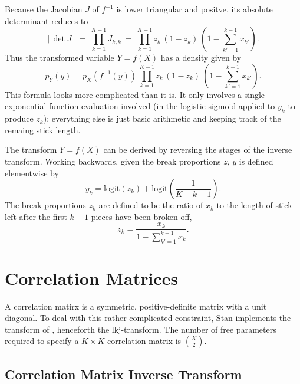 \documentclass[10pt]{report}
\newcommand{\Stan}{Stan\xspace}
\newcommand{\acronym}[1]{{\sc #1}\xspace}
\newcommand{\LKJ}{\acronym{lkj}}
\begin{document}
Because the Jacobian $J$ of $f^{-1}$ is lower triangular and positve, its
absolute determinant reduces to
%
\[
\left| \, \det J \, \right|
\ = \
\prod_{k=1}^{K-1} J_{k,k}
\ = \
\prod_{k=1}^{K-1} 
z_k
\, 
(1 - z_k)
\
\left(
1 - \sum_{k'=1}^{k-1} x_{k'}
\right)
.
\]
%
Thus the transformed variable $Y = f(X)$ has a density given by
%
\[
p_Y(y) 
= p_X(f^{-1}(y))
\,
\prod_{k=1}^{K-1} 
z_k
\, 
(1 - z_k)
\
\left(
1 - \sum_{k'=1}^{k-1} x_{k'}
\right)
.
\]
%
This formula looks more complicated than it is.  It only involves a
single exponential function evaluation involved (in the logistic
sigmoid applied to $y_k$ to produce $z_k$);  everything else is just
basic arithmetic and keeping track of the remaing stick length.

The transform $Y = f(X)$ can be derived by reversing the stages of the
inverse transform.  Working backwards, given the break proportions
$z$, $y$ is defined elementwise by
%
\[
y_k 
= \mbox{logit}(z_k)
+ \mbox{logit}\left(
   \frac{1}{K-k+1}
   \right)
.
\]
%
The break proportions $z_k$ are defined to be the ratio of $x_k$ to
the length of stick left after the first $k-1$ pieces have been broken
off, 
%
\[
z_k 
= \frac{x_k}
       {1 - \sum_{k' = 1}^{k-1} x_k}
.
\]

\section{Correlation Matrices}

A correlation matirx is a symmetric, positive-definite matrix with a
unit diagonal.  To deal with this rather complicated constraint, \Stan
implements the transform of \cite{LewandowskiKurowickaJoe:2009},
henceforth the \LKJ-transform.  The number of free parameters required
to specify a $K \times K$ correlation matrix is $K \choose 2$.

\subsection{Correlation Matrix Inverse Transform}
\end{document}
